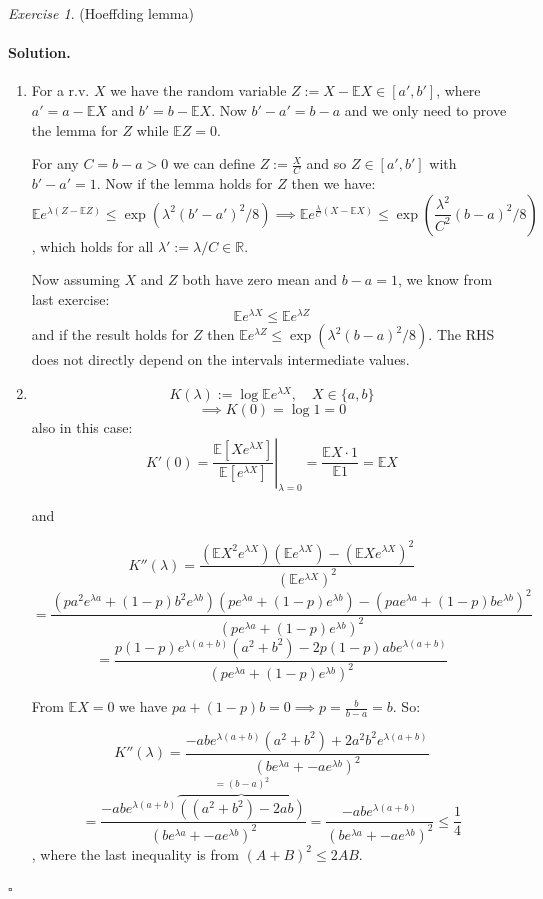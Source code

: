 \documentclass[11pt]{article}
\theoremstyle{definition}
\theoremstyle{remark}
\newtheorem{exercise}{Exercise}[section]
\newenvironment{solution}{\paragraph{Solution.}}{\hfill$\square$\medskip}
\newcommand{\E}{\mathbb{E}}
\newcommand{\R}{\mathbb{R}}
\newcommand{\1}{\mathbf{1}}
\begin{document}
	
\begin{exercise}
	(Hoeffding lemma)
\end{exercise}	
\begin{solution}
	\begin{enumerate}
		\item 
		For a r.v. \(X\) we have the random variable \(Z := X - \E X  \in [a',b']\), where \(a' = a - \E X\) and \(b' = b - \E X\). Now \(b'-a' = b - a\) and we only need to prove the lemma for \(Z\) while \(\E Z = 0\).
		
		For any \(C = b - a > 0\) we can define \(Z := \frac{X}{C} \) and so \(Z \in [a', b']\) with \(b'-a' = 1\). Now if the lemma holds for \(Z\) then we have:
		 \[
		 \E e^{\lambda(Z - \E Z)} \leq \exp( \lambda^2 (b' - a')^2 / 8) \implies
		 \E e^{\frac{\lambda}{C}(X - \E X)} \leq \exp( \frac{\lambda^2}{C^2} (b - a)^2 / 8)
		 \],
		 which holds for all \(\lambda' := \lambda/C \in \R\).
		 
		 Now assuming \(X\) and \(Z\) both have zero mean and \(b-a = 1\),  we know from last exercise:
		 \[
		 \E e^{\lambda X} \leq \E e^{\lambda Z}
		 \]
		 and if the result holds for \(Z\) then \(\E e^{\lambda Z} \leq \exp( \lambda^2 (b - a)^2 / 8) \). The RHS does not directly depend on the intervals intermediate values.
		 
		 
		 \item 
		 \[
		 K(\lambda) := \log \E e^{\lambda X}, \quad X \in \{a, b\}
		 \]
		 \[
		 \implies K(0) = \log 1 = 0
		 \]
		 also in this case:
		 \[
		 K'(0)=\left.\frac{\mathbb{E}[X e^{\lambda X}]}{\mathbb{E}[e^{\lambda X}]}\right|_{\lambda=0}
		 = \frac{\E X \cdot 1}{ \E 1 } = \E X
		 \]
		 
		 and
		 
		 \[
		 K'' (\lambda) = \frac{(\E X^2 e^{\lambda X})(\E e^{\lambda X}) - (\E X e^{\lambda X})^2 }{ (\E e^{\lambda X})^2 } 
		 \]
		 \[
		  = \frac{ ( p a^2 e^{\lambda a} +  (1-p) b^2 e^{\lambda b}) (p e^{\lambda a} +  (1-p) e^{\lambda b}) - (p a e^{\lambda a} +  (1-p) b e^{\lambda b})^2 }{ (p e^{\lambda a} +  (1-p) e^{\lambda b})^2 }
		 \]
		 \[
		 = \frac{ p(1-p) e^{\lambda (a+b)}(a^2 + b^2) - 2 p(1-p)ab e^{\lambda (a + b)} }{  (p e^{\lambda a} +  (1-p) e^{\lambda b})^2 }
		 \]
		 
		 From \(\E X = 0\) we have \(pa + (1-p)b = 0 \implies p = \frac{b}{b-a} = b\). So:
		 
		 \[
		 K'' (\lambda) = \frac{ -ab e^{\lambda (a+b)}(a^2 + b^2) + 2 a^2b^2 e^{\lambda (a + b)} }{  (b e^{\lambda a} +  -a e^{\lambda b})^2 }
		 \]
		 \[
		 =  \frac{ -ab e^{\lambda (a+b)} \overbrace{((a^2 + b^2) -2ab)}^{ = (b-a)^2} }{  (b e^{\lambda a} +  -a e^{\lambda b})^2 }
		  = \frac{-ab e^{\lambda (a+b) }}{  (b e^{\lambda a} +  -a e^{\lambda b})^2 } \leq \frac{1}{4}
		 \]
		, where the last inequality is from \(( A + B)^2 \leq 2 AB \).
		 

\end{enumerate}
\end{solution}
\end{document}
